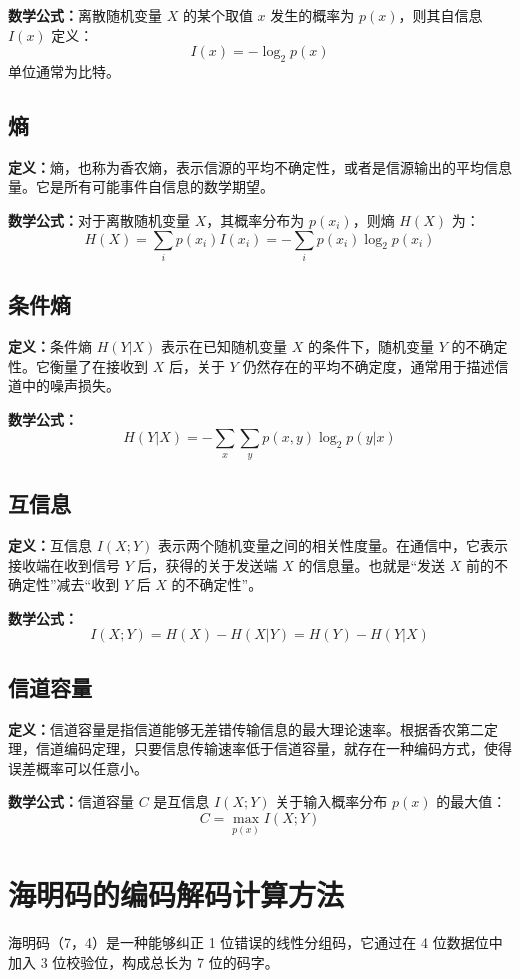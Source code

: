 \documentclass{article}
\begin{document}
\textbf{数学公式：}离散随机变量 $X$ 的某个取值 $x$ 发生的概率为 $p(x)$，则其自信息 $I(x)$ 定义：
\[ I(x) = -\log_2 p(x) \]
单位通常为比特。



\subsection{熵}
\textbf{定义：}熵，也称为香农熵，表示信源的平均不确定性，或者是信源输出的平均信息量。它是所有可能事件自信息的数学期望。

\textbf{数学公式：}对于离散随机变量 $X$，其概率分布为 $p(x_i)$，则熵 $H(X)$ 为：
\[ H(X) = \sum_{i} p(x_i) I(x_i) = -\sum_{i} p(x_i) \log_2 p(x_i) \]

\subsection{条件熵}
\textbf{定义：}条件熵 $H(Y|X)$ 表示在已知随机变量 $X$ 的条件下，随机变量 $Y$ 的不确定性。它衡量了在接收到 $X$ 后，关于 $Y$ 仍然存在的平均不确定度，通常用于描述信道中的噪声损失。

\textbf{数学公式：}
\[ H(Y|X) = -\sum_{x} \sum_{y} p(x,y) \log_2 p(y|x) \]



\subsection{互信息}
\textbf{定义：}互信息 $I(X;Y)$ 表示两个随机变量之间的相关性度量。在通信中，它表示接收端在收到信号 $Y$ 后，获得的关于发送端 $X$ 的信息量。也就是“发送 $X$ 前的不确定性”减去“收到 $Y$ 后 $X$ 的不确定性”。

\textbf{数学公式：}
\[ I(X;Y) = H(X) - H(X|Y) = H(Y) - H(Y|X) \]



\subsection{信道容量}
\textbf{定义：}信道容量是指信道能够无差错传输信息的最大理论速率。根据香农第二定理，信道编码定理，只要信息传输速率低于信道容量，就存在一种编码方式，使得误差概率可以任意小。

\textbf{数学公式：}信道容量 $C$ 是互信息 $I(X;Y)$ 关于输入概率分布 $p(x)$ 的最大值：
\[ C = \max_{p(x)} I(X;Y) \]



\section{海明码的编码解码计算方法}
海明码（7，4）是一种能够纠正 1 位错误的线性分组码，它通过在 4 位数据位中加入 3 位校验位，构成总长为 7 位的码字。
\end{document}
